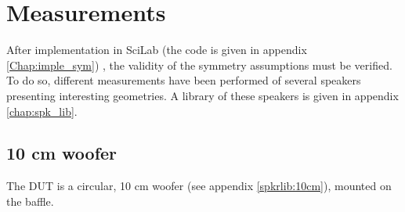 \documentclass{report}
\begin{document}


\section{Measurements}

After implementation in SciLab (the code is given in appendix \ref{Chap:imple_sym}) , the validity of the symmetry assumptions must be verified. To do so, different measurements have been performed of several speakers presenting interesting geometries. A library of these speakers is given in appendix \ref{chap:spk_lib}. 


\subsection{10 cm woofer}

The DUT is a circular, 10 cm woofer (see appendix \ref{spkrlib:10cm}), mounted on the baffle. \\
\end{document}
